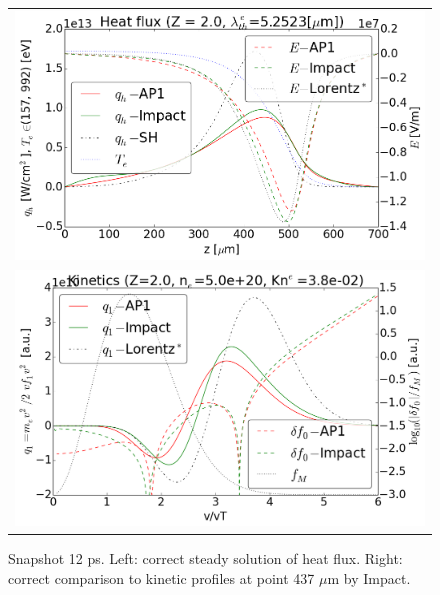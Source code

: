 \begin{figure}[tbh]
  \begin{center}
    \begin{tabular}{c}
      \includegraphics[width=\figscale\textwidth]{../VFPdata/C7_Impact_case3_heatflux.png} \\
      \includegraphics[width=\figscale\textwidth]{../VFPdata/C7_Impact_case3_kinetics.png}
    \end{tabular}
  \caption{  
  Snapshot 12 ps. Left: correct steady solution of heat flux. Right: correct comparison to kinetic profiles at point 437 $\mu$m by Impact.}
  \end{center}
  \label{fig:C7_Impact_case3}
\end{figure}

